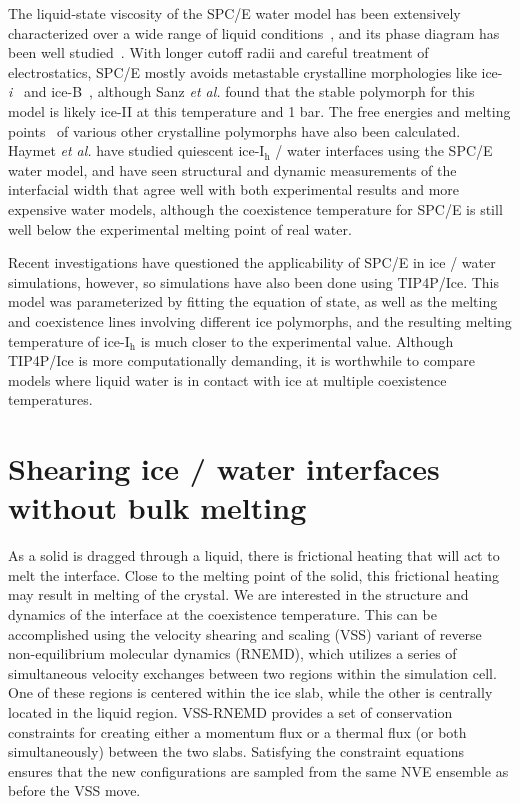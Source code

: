 The liquid-state viscosity of the SPC/E water model has been
extensively characterized over a wide range of liquid
conditions~\cite{Kuang2012}, and its phase diagram has been well
studied~\cite{Baez1995,Bryk2004,Sanz2004a,Fennell2005}. With longer
cutoff radii and careful treatment of electrostatics, SPC/E mostly
avoids metastable crystalline morphologies like
ice-\textit{i}~\cite{Fennell2005} and ice-B~\cite{Baez1995}, although
Sanz \textit{et al.}\cite{Sanz2004a} found that the stable polymorph
for this model is likely ice-II at this temperature and 1 bar. The
free energies and melting
points~\cite{Baez1995,Arbuckle2002,Gay2002,Bryk2002,Bryk2004,Sanz2004a,Fennell2005,Fernandez2006,Abascal2007,Vrbka2007}
of various other crystalline polymorphs have also been calculated.
Haymet \textit{et al.}\cite{Bryk2002} have studied quiescent
ice-I$_\mathrm{h}$ / water interfaces using the SPC/E water model, and
have seen structural and dynamic measurements of the interfacial width
that agree well with both experimental results and more expensive
water models, although the coexistence temperature for SPC/E is still
well below the experimental melting point of real water.  

Recent investigations have questioned the applicability of SPC/E in
ice / water simulations,\cite{Vega2005c,Vega2011a,Gladich2012,Gallo2016}
however, so simulations have also been done using
TIP4P/Ice.\cite{Abascal2005} This model was parameterized by fitting
the equation of state, as well as the melting and coexistence lines
involving different ice polymorphs, and the resulting melting
temperature of ice-I$_\mathrm{h}$ is much closer to the experimental
value.\cite{Abascal2005} Although TIP4P/Ice is more computationally
demanding, it is worthwhile to compare models where liquid water is in
contact with ice at multiple coexistence temperatures.

\section{Shearing ice / water interfaces without bulk melting}

As a solid is dragged through a liquid, there is frictional heating
that will act to melt the interface.  Close to the melting point of the
solid, this frictional heating may result in melting of the crystal.
We are interested in the structure and dynamics of the interface at
the coexistence temperature.  This can be accomplished using the velocity
shearing and scaling (VSS) variant of reverse non-equilibrium
molecular dynamics (RNEMD), which utilizes a series of simultaneous
velocity exchanges between two regions within the simulation
cell.\cite{Kuang12} One of these regions is centered within the ice
slab, while the other is centrally located in the liquid
region. VSS-RNEMD provides a set of conservation constraints for
creating either a momentum flux or a thermal flux (or both
simultaneously) between the two slabs.  Satisfying the constraint
equations ensures that the new configurations are sampled from the
same NVE ensemble as before the VSS move.


